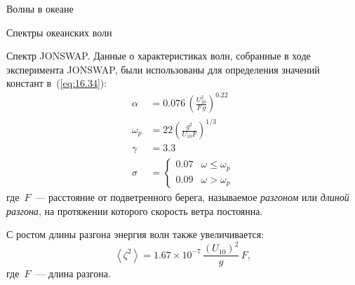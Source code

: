 \begin{chapter}{Волны в океане}
\begin{section}{Спектры океанских волн}
\begin{paragraph}{Спектр JONSWAP.}
Данные о характеристиках волн, собранные в ходе эксперимента JONSWAP, были
использованы для определения значений констант в~(\ref{eq:16.34}):
\begin{subequations}
\begin{align}
\alpha &= 0.076 \, \left( \frac{U_{10}^{2}}{F \, g} \right)^{0.22} \\
\omega_p &= 22 \left(\frac{g^2}{U_{10}F}\right)^{1/3} \\
\gamma &= 3.3 \\
   \sigma &= \left\{ \begin{array}{ll}
                    0.07 & \omega \leq \omega _{p} \\
                    0.09 & \omega > \omega _{p}
                    \end{array}
            \right.
\end{align}
\end{subequations}
где~$F$~--- расстояние от подветренного берега, называемое 
\emph{разгоном} или
\emph{длиной разгона}, на протяжении которого скорость ветра постоянна.
%

С ростом длины разгона энергия волн также увеличивается:
\begin{equation}
\left< \zeta ^{2}\right> = 1.67 \times 10^{-7}\, \frac{\left( U_{10} \right)^{2} }{g}  \, F,
\end{equation}
где~$F$~--- длина разгона.
%


\end{paragraph}
\end{section}
\end{chapter}
